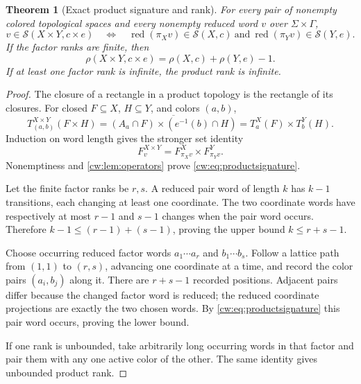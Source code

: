 \documentclass[11pt,letterpaper]{article}
\numberwithin{equation}{section}
\newtheorem{theorem}{Theorem}[section]
\theoremstyle{definition}
\theoremstyle{remark}
\theoremstyle{definition}
\newcommand{\red}{\operatorname{red}}
\newcommand{\cwcl}[1]{\overline{#1}}
\newcommand{\cwSig}{\mathcal S}
\begin{document}
\begin{theorem}[Exact product signature and rank]\label{cw:thm:product}
For every pair of nonempty colored topological spaces and every nonempty
reduced word $v$ over $\Sigma\times\Gamma$,
\begin{equation}\label{cw:eq:productsignature}
 v\in\cwSig(X\times Y,c\times e)
 \quad\Longleftrightarrow\quad
 \red(\pi_Xv)\in\cwSig(X,c)\ \text{and}\
 \red(\pi_Yv)\in\cwSig(Y,e).
\end{equation}
If the factor ranks are finite, then
\begin{equation}\label{cw:eq:productrank}
 \boxed{\ \rho(X\times Y,c\times e)=\rho(X,c)+\rho(Y,e)-1.\ }
\end{equation}
If at least one factor rank is infinite, the product rank is infinite.
\end{theorem}
\begin{proof}
The closure of a rectangle in a product topology is the rectangle of its
closures. For closed $F\subseteq X$, $H\subseteq Y$, and colors $(a,b)$,
\[
 T^{X\times Y}_{(a,b)}(F\times H)
 =\cwcl{(A_a\cap F)\times(e^{-1}(b)\cap H)}
 =T^X_a(F)\times T^Y_b(H).
\]
Induction on word length gives the stronger set identity
\begin{equation}\label{cw:eq:rectangle}
 F^{X\times Y}_v=F^X_{\pi_Xv}\times F^Y_{\pi_Yv}.
\end{equation}
Nonemptiness and \cref{cw:lem:operators} prove \eqref{cw:eq:productsignature}.

Let the finite factor ranks be $r,s$. A reduced pair word of length $k$
has $k-1$ transitions, each changing at least one coordinate. The two
coordinate words have respectively at most $r-1$ and $s-1$ changes when
the pair word occurs. Therefore
$k-1\le(r-1)+(s-1)$, proving the upper bound $k\le r+s-1$.

Choose occurring reduced factor words $a_1\cdots a_r$ and
$b_1\cdots b_s$. Follow a lattice path from $(1,1)$ to $(r,s)$, advancing
one coordinate at a time, and record the color pairs $(a_i,b_j)$ along
it. There are $r+s-1$ recorded positions. Adjacent pairs differ because
the changed factor word is reduced; the reduced coordinate projections
are exactly the two chosen words. By \eqref{cw:eq:productsignature} this
pair word occurs, proving the lower bound.

If one rank is unbounded, take arbitrarily long occurring words in that
factor and pair them with any one active color of the other. The same
identity gives unbounded product rank.
\end{proof}
\end{document}
